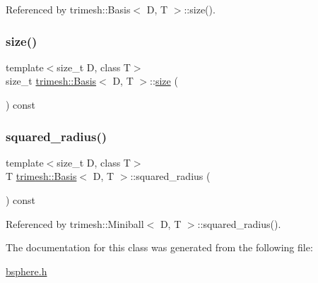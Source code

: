 Referenced by trimesh\+::\+Basis$<$ D, T $>$\+::size().

\mbox{\label{classtrimesh_1_1Basis_ab6a1d0fdbcbbaa787d94100ebe1ab3b1}} 
\subsubsection{\texorpdfstring{size()}{size()}}
{\footnotesize\ttfamily template$<$size\+\_\+t D, class T$>$ \\
size\+\_\+t \hyperlink{classtrimesh_1_1Basis}{trimesh\+::\+Basis}$<$ D, T $>$\+::\hyperlink{namespacetrimesh_a1c71e2912be63f694df9e9991bddb15e}{size} (\begin{DoxyParamCaption}{ }\end{DoxyParamCaption}) const\hspace{0.3cm}{\ttfamily [inline]}}

\mbox{\label{classtrimesh_1_1Basis_a6af18ad45b2e277767edc07ef7edeaba}} 
\subsubsection{\texorpdfstring{squared\+\_\+radius()}{squared\_radius()}}
{\footnotesize\ttfamily template$<$size\+\_\+t D, class T$>$ \\
T \hyperlink{classtrimesh_1_1Basis}{trimesh\+::\+Basis}$<$ D, T $>$\+::squared\+\_\+radius (\begin{DoxyParamCaption}{ }\end{DoxyParamCaption}) const\hspace{0.3cm}{\ttfamily [inline]}}



Referenced by trimesh\+::\+Miniball$<$ D, T $>$\+::squared\+\_\+radius().



The documentation for this class was generated from the following file\+:\begin{DoxyCompactItemize}
\item 
\hyperlink{bsphere_8h}{bsphere.\+h}\end{DoxyCompactItemize}
